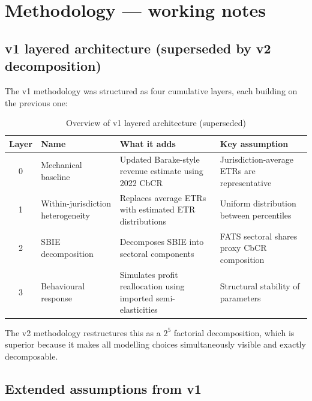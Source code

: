\documentclass[11pt,a4paper]{article}
\begin{document}
\section{Methodology --- working notes}\label{w:methodology}

\subsection{v1 layered architecture (superseded by v2 decomposition)}

The v1 methodology was structured as four cumulative layers, each building on the previous one:

\begin{table}[H]
\centering
\caption{Overview of v1 layered architecture (superseded)}
\label{tab:layers_v1}
\small
\begin{tabular}{@{}clp{5.5cm}p{4.5cm}@{}}
\toprule
Layer & Name & What it adds & Key assumption \\
\midrule
0 & Mechanical baseline & Updated Barake-style revenue estimate using 2022 CbCR & Jurisdiction-average ETRs are representative \\
1 & Within-jurisdiction heterogeneity & Replaces average ETRs with estimated ETR distributions & Uniform distribution between percentiles \\
2 & SBIE decomposition & Decomposes SBIE into sectoral components & FATS sectoral shares proxy CbCR composition \\
3 & Behavioural response & Simulates profit reallocation using imported semi-elasticities & Structural stability of parameters \\
\bottomrule
\end{tabular}
\end{table}

The v2 methodology restructures this as a $2^5$ factorial decomposition, which is superior because it makes all modelling choices simultaneously visible and exactly decomposable.

\subsection{Extended assumptions from v1}
\end{document}

